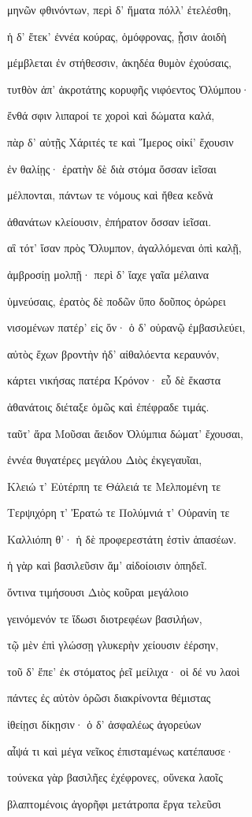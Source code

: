\begin{pages}
\begin{Leftside}
μηνῶν φθινόντων, περὶ δ' ἤματα πόλλ' ἐτελέσθη,

ἡ δ' ἔτεκ' ἐννέα κούρας, ὁμόφρονας, ᾗσιν ἀοιδὴ  

μέμβλεται ἐν στήθεσσιν, ἀκηδέα θυμὸν ἐχούσαις,

τυτθὸν ἀπ' ἀκροτάτης κορυφῆς νιφόεντος Ὀλύμπου·

ἔνθά σφιν λιπαροί τε χοροὶ καὶ δώματα καλά,

πὰρ δ' αὐτῇς Χάριτές τε καὶ Ἵμερος οἰκί' ἔχουσιν

ἐν θαλίῃς· ἐρατὴν δὲ διὰ στόμα ὄσσαν ἱεῖσαι  

μέλπονται, πάντων τε νόμους καὶ ἤθεα κεδνὰ 

ἀθανάτων κλείουσιν, ἐπήρατον ὄσσαν ἱεῖσαι.

αἳ τότ' ἴσαν πρὸς Ὄλυμπον, ἀγαλλόμεναι ὀπὶ καλῇ, 

ἀμβροσίῃ μολπῇ· περὶ δ' ἴαχε γαῖα μέλαινα 

ὑμνεύσαις, ἐρατὸς δὲ ποδῶν ὕπο δοῦπος ὀρώρει 

νισομένων πατέρ' εἰς ὅν· ὁ δ' οὐρανῷ ἐμβασιλεύει, 

αὐτὸς ἔχων βροντὴν ἠδ' αἰθαλόεντα κεραυνόν,

κάρτει νικήσας πατέρα Κρόνον· εὖ δὲ ἕκαστα 

ἀθανάτοις διέταξε ὁμῶς καὶ ἐπέφραδε τιμάς.

ταῦτ' ἄρα Μοῦσαι ἄειδον Ὀλύμπια δώματ' ἔχουσαι, 

ἐννέα θυγατέρες μεγάλου Διὸς ἐκγεγαυῖαι,

Κλειώ τ' Εὐτέρπη τε Θάλειά τε Μελπομένη τε

Τερψιχόρη τ' Ἐρατώ τε Πολύμνιά τ' Οὐρανίη τε

Καλλιόπη θ'· ἡ δὲ προφερεστάτη ἐστὶν ἁπασέων. 

ἡ γὰρ καὶ βασιλεῦσιν ἅμ' αἰδοίοισιν ὀπηδεῖ.  

ὅντινα τιμήσουσι Διὸς κοῦραι μεγάλοιο

γεινόμενόν τε ἴδωσι διοτρεφέων βασιλήων,

τῷ μὲν ἐπὶ γλώσσῃ γλυκερὴν χείουσιν ἐέρσην,

τοῦ δ' ἔπε' ἐκ στόματος ῥεῖ μείλιχα· οἱ δέ νυ λαοὶ 

πάντες ἐς αὐτὸν ὁρῶσι διακρίνοντα θέμιστας 

ἰθείῃσι δίκῃσιν· ὁ δ' ἀσφαλέως ἀγορεύων

αἶψά τι καὶ μέγα νεῖκος ἐπισταμένως κατέπαυσε· 

τούνεκα γὰρ βασιλῆες ἐχέφρονες, οὕνεκα λαοῖς 

βλαπτομένοις ἀγορῆφι μετάτροπα ἔργα τελεῦσι


\end{Leftside}
\end{pages}
